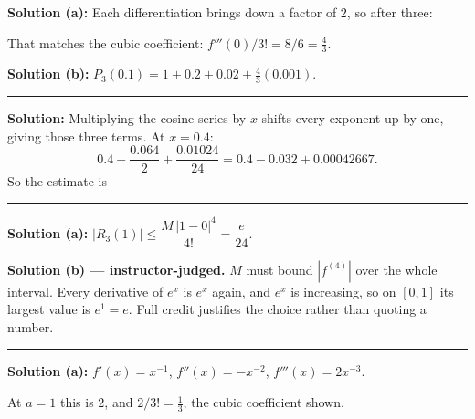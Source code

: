 \documentclass[12pt]{article}
\begin{document}



\textbf{Solution (a):} Each differentiation brings down a factor of $2$, so after three: 

That matches the cubic coefficient: $f'''(0)/3! = 8/6 = \frac43$.

\textbf{Solution (b):} $P_3(0.1) = 1 + 0.2 + 0.02 + \frac43(0.001)$. 

\vspace{0.2cm}\noindent\rule{\linewidth}{0.2pt}\vspace{0.2cm}


\textbf{Solution:} Multiplying the cosine series by $x$ shifts every exponent up by one, giving those three terms. At $x = 0.4$:
\[ 0.4 - \frac{0.064}{2} + \frac{0.01024}{24} = 0.4 - 0.032 + 0.00042667. \]
So the estimate is 

\vspace{0.2cm}\noindent\rule{\linewidth}{0.2pt}\vspace{0.2cm}


\textbf{Solution (a):} $|R_3(1)| \le \dfrac{M\,|1-0|^{4}}{4!} = \dfrac{e}{24}$. 

\textbf{Solution (b) --- instructor-judged.} $M$ must bound $|f^{(4)}|$ over the whole interval. Every derivative of $e^{x}$ is $e^{x}$ again, and $e^{x}$ is increasing, so on $[0,1]$ its largest value is $e^{1} = e$. Full credit justifies the choice rather than quoting a number.

\vspace{0.2cm}\noindent\rule{\linewidth}{0.2pt}\vspace{0.2cm}


\textbf{Solution (a):} $f'(x) = x^{-1}$, $f''(x) = -x^{-2}$, $f'''(x) = 2x^{-3}$. 

At $a = 1$ this is $2$, and $2/3! = \frac13$, the cubic coefficient shown.
\end{document}
